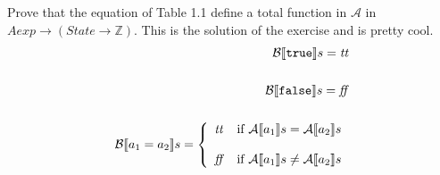 \documentclass[
10pt, %
a4paper, %
oneside, %
fleqn,
leqno,
headinclude,footinclude, %
BCOR5mm, %
]{scrartcl}
\begin{document}
\maketitle 
\setcounter{tocdepth}{3} 
\setcounter{secnumdepth}{0}
\tableofcontents 

\newpage 

{Prove that the equation of Table 1.1 define a total function in $\mathcal{A}$ in $Aexp \rightarrow (State \rightarrow \mathbb{Z})$.}
{
 This is the solution of the exercise and is pretty cool.
  \begin{align*}
  \B{\syntrue} = \semtrue \\ \\
  \B{\synfalse} = \semfalse \\ \\
  \B{a_1 = a_2} = \caseFun{\semtrue}{\A{a_1} = \A{a_2}}{\semfalse}{\A{a_1} \neq 
\A{a_2}} \\ \\
  \end{align*}
}
\end{document}
